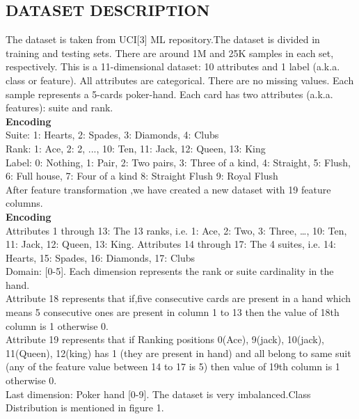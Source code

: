 \documentclass[11pt, oneside]{article}   	%
\begin{document}
 \subsection{DATASET DESCRIPTION}
The dataset is taken from UCI[3] ML repository.The dataset is divided in training and testing sets. There are around 1M and 25K samples in each set, respectively. This is a 11-dimensional dataset: 10 attributes and 1 label (a.k.a. class or feature). All attributes are categorical. There are no missing values. Each sample represents a 5-cards poker-hand. Each card
has two attributes (a.k.a. features): suite and rank.\\
\textbf{Encoding}\\
Suite: 1: Hearts, 2: Spades, 3: Diamonds, 4: Clubs\\
Rank: 1: Ace, 2: 2, ..., 10: Ten, 11: Jack, 12: Queen, 13: King\\
Label: 0: Nothing, 1: Pair, 2: Two pairs, 3: Three of a kind, 4:
Straight, 5: Flush, 6: Full house, 7: Four of a kind 8: Straight
Flush 9: Royal Flush\\
After feature transformation ,we have created a new dataset with 19 feature columns.\\
\textbf{Encoding}\\
Attributes 1 through 13: The 13 ranks, i.e. 1: Ace, 2: Two, 3:
Three, …, 10: Ten, 11: Jack, 12: Queen, 13: King.
Attributes 14 through 17: The 4 suites, i.e. 14: Hearts, 15:
Spades, 16: Diamonds, 17: Clubs\\
Domain: [0-5]. Each dimension represents the rank or suite
cardinality in the hand.\\
Attribute 18 represents that if,five consecutive cards are present in a hand which means 5 consecutive ones are present in column 1 to 13 then the value of 18th column is 1 otherwise 0.\\
Attribute 19 represents that if Ranking positions 0(Ace), 9(jack), 10(jack), 11(Queen), 12(king) has 1 (they are present in hand) and all belong to same suit (any of the feature value between 14 to 17 is 5) then value of 19th column is 1 otherwise 0.\\
Last dimension: Poker hand [0-9].
The dataset is very imbalanced.Class Distribution is mentioned in figure 1.
\end{document}
